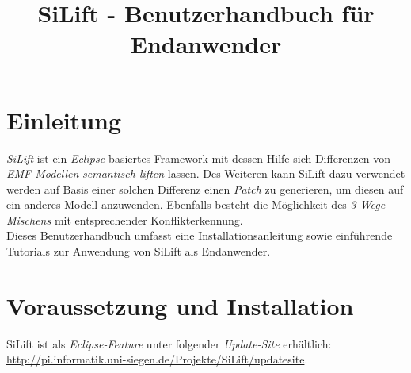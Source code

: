 \documentclass[a4paper]{scrartcl}
\begin{document}
\title{SiLift - Benutzerhandbuch für Endanwender}


\maketitle



\newpage

\tableofcontents
\newpage

\section{Einleitung}

\textit{SiLift} ist ein \textit{Eclipse-}basiertes Framework mit dessen Hilfe sich Differenzen von \textit{EMF-Modellen} \textit{semantisch liften} lassen.
Des Weiteren kann SiLift dazu verwendet werden auf Basis einer solchen Differenz einen \textit{Patch} zu generieren, um diesen auf ein anderes Modell anzuwenden.
Ebenfalls besteht die Möglichkeit des \textit{3-Wege-Mischens} mit entsprechender Konflikterkennung.\\
Dieses Benutzerhandbuch umfasst eine Installationsanleitung sowie einführende Tutorials zur Anwendung von SiLift als Endanwender.
\section{Voraussetzung und Installation}

SiLift ist als \textit{Eclipse-Feature} unter folgender \textit{Update-Site} erhältlich:\\ \url{http://pi.informatik.uni-siegen.de/Projekte/SiLift/updatesite}.\\
\end{document}
